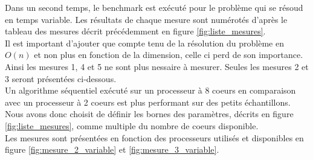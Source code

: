 Dans un second temps, le benchmark est exécuté pour le problème qui se résoud en temps variable. Les résultats de chaque mesure sont numérotés d'après le tableau des mesures décrit précédemment en figure \ref{fig:liste_mesures}.\\

Il est important d'ajouter que compte tenu de la résolution du problème en $O(n)$ et non plus en fonction de la dimension, celle ci perd de son importance. Ainsi les mesures 1, 4 et 5 ne sont plus nessaire à mesurer. Seules les mesures 2 et 3 seront présentées ci-dessous.\\

Un algorithme séquentiel exécuté sur un processeur à 8 coeurs en comparaison avec un processeur à 2 coeurs est plus performant sur des petits échantillons. Nous avons donc choisit de définir les bornes des paramètres, décrits en figure \ref{fig:liste_mesures}, comme multiple du nombre de coeurs disponible.\\

Les mesures sont présentées en fonction des processeurs utilisés et disponibles en figure \ref{fig:mesure_2_variable} et \ref{fig:mesure_3_variable}.

